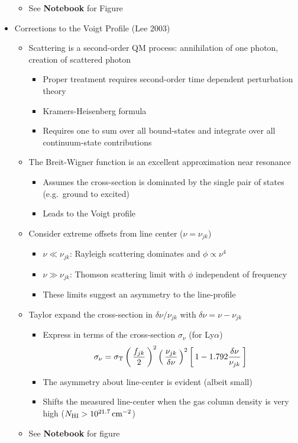 \documentclass[12pt,letterpaper]{article}
\begin{document}
\begin{Aenumerate}
\begin{itemize}
\begin{itemize}
	\item See {\bf Notebook} for Figure
	\end{itemize}
 

\item Corrections to the Voigt Profile (Lee 2003)
	\begin{itemize}
	\item Scattering is a second-order QM process: annihilation of 
	one photon, creation of scattered photon
	  \begin{itemize}
	  \item Proper treatment requires second-order time dependent perturbation
	  theory
	  \item Kramers-Heisenberg formula
	  \item Requires one to sum over all bound-states and integrate over
	  all continuum-state contributions
	  \end{itemize}
	\item The Breit-Wigner function is an excellent approximation
	near resonance
	  \begin{itemize}
	  \item Assumes the cross-section is dominated by the single 
	  pair of states (e.g.\ ground to excited)
	  \item Leads to the Voigt profile
	  \end{itemize}
	\item Consider extreme offsets from line center ($\nu = \nu_{jk}$)
	  \begin{itemize}
	  \item $\nu \ll \nu_{jk}$: Rayleigh scattering dominates and
	  $\phi \propto \nu^4$
	  \item $\nu \gg \nu_{jk}$: Thomson scattering limit with $\phi$
	  independent of frequency
	  \item These limits suggest an asymmetry to the line-profile
	  \end{itemize}
	\item Taylor expand the cross-section in $\delta\nu/\nu_{jk}$
	with $\delta\nu = \nu-\nu_{jk}$
		\begin{itemize}
		\item Express in terms of the cross-section $\sigma_\nu$ (for Ly$\alpha$)
		\begin{equation}
		\sigma_\nu = \sigma_{\rm T} \left ( \, \frac{f_{jk}}{2} \, \right )^2 
		\left ( \, \frac{\nu_{jk}}{\delta\nu} \, \right )^2
		\left [ \, 1 - 1.792 \frac{\delta\nu}{\nu_{jk}} \, \right ]
		\end{equation}
		\item The asymmetry about line-center is evident (albeit small)
		\item Shifts the measured line-center when the gas column 
		density is very high ($N_{\rm HI} > 10^{21.7} \, {\rm cm^{-2}}$)
		\end{itemize}
	\item See {\bf Notebook} for figure
	\end{itemize}


\end{itemize}
\end{Aenumerate}
\end{document}
